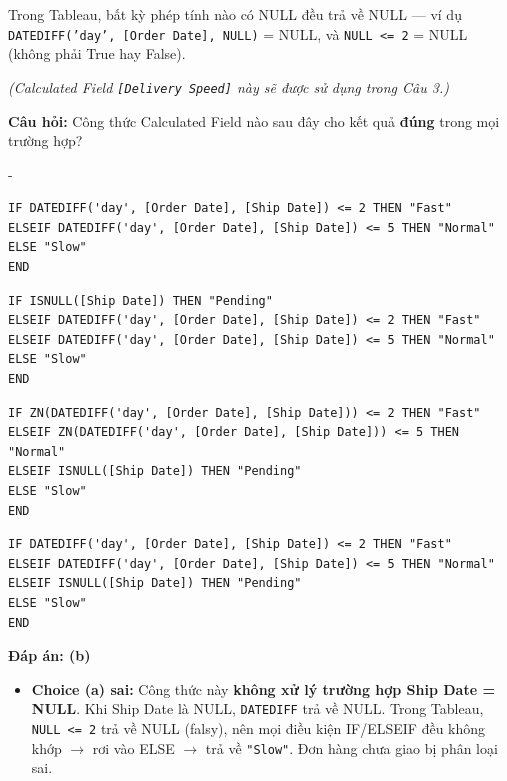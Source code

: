 \documentclass[12pt]{article}
\newcounter{choice}
\renewcommand\thechoice{($\alph{choice}$)}
\newcommand\choicelabel{\thechoice}
\newenvironment{choices}%
  {\list{\choicelabel}%
     {\usecounter{choice}\def\makelabel##1{\hss\llap{##1}}%
       \settowidth{\leftmargin}{W.\hskip\labelsep\hskip 0 em}%
       \def\choice{%
         \item
       } %
       \labelwidth\leftmargin\advance\labelwidth-\labelsep
       \topsep=0pt
       \partopsep=0pt
     }%
  }%
  {\endlist}
\begin{document}
\begin{enumerate}[label=\textbf{Câu \arabic*.}, leftmargin=*, labelsep=1em, itemsep=2em]
\begin{notebox}
Trong Tableau, bất kỳ phép tính nào có NULL đều trả về NULL --- ví dụ \texttt{DATEDIFF('day', [Order Date], NULL)} = NULL, và \texttt{NULL <= 2} = NULL (không phải True hay False).
\end{notebox}

\textit{(Calculated Field \texttt{[Delivery Speed]} này sẽ được sử dụng trong Câu 3.)}

\textbf{Câu hỏi:} Công thức Calculated Field nào sau đây cho kết quả \textbf{đúng} trong mọi trường hợp?

\begin{choices}
    \choice
    \begin{lstlisting}[style=tableau]
IF DATEDIFF('day', [Order Date], [Ship Date]) <= 2 THEN "Fast"
ELSEIF DATEDIFF('day', [Order Date], [Ship Date]) <= 5 THEN "Normal"
ELSE "Slow"
END
    \end{lstlisting}

    \choice
    \begin{lstlisting}[style=tableau]
IF ISNULL([Ship Date]) THEN "Pending"
ELSEIF DATEDIFF('day', [Order Date], [Ship Date]) <= 2 THEN "Fast"
ELSEIF DATEDIFF('day', [Order Date], [Ship Date]) <= 5 THEN "Normal"
ELSE "Slow"
END
    \end{lstlisting}

    \choice
    \begin{lstlisting}[style=tableau]
IF ZN(DATEDIFF('day', [Order Date], [Ship Date])) <= 2 THEN "Fast"
ELSEIF ZN(DATEDIFF('day', [Order Date], [Ship Date])) <= 5 THEN "Normal"
ELSEIF ISNULL([Ship Date]) THEN "Pending"
ELSE "Slow"
END
    \end{lstlisting}

    \choice
    \begin{lstlisting}[style=tableau]
IF DATEDIFF('day', [Order Date], [Ship Date]) <= 2 THEN "Fast"
ELSEIF DATEDIFF('day', [Order Date], [Ship Date]) <= 5 THEN "Normal"
ELSEIF ISNULL([Ship Date]) THEN "Pending"
ELSE "Slow"
END
    \end{lstlisting}
\end{choices}

\textbf{Đáp án: (b)}

\begin{guidelinebox}

\begin{itemize}
    \item \textbf{Choice (a) sai:} Công thức này \textbf{không xử lý trường hợp Ship Date = NULL}. Khi Ship Date là NULL, \texttt{DATEDIFF} trả về NULL. Trong Tableau, \texttt{NULL <= 2} trả về NULL (falsy), nên mọi điều kiện IF/ELSEIF đều không khớp $\rightarrow$ rơi vào ELSE $\rightarrow$ trả về \texttt{"Slow"}. Đơn hàng chưa giao bị phân loại sai.


\end{itemize}
\end{guidelinebox}
\end{enumerate}
\end{document}
